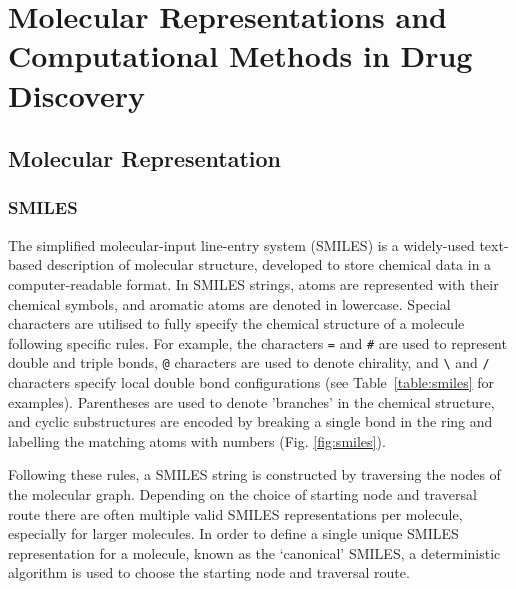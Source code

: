 \chapter{Molecular Representations and Computational Methods in Drug Discovery} \label{ch:background}

\section{Molecular Representation}

\subsection{SMILES}
The simplified molecular-input line-entry system (SMILES) \cite{Weininger1988, Weininger1989} is a widely-used text-based description of molecular structure, developed to store chemical data in a computer-readable format. In SMILES strings, atoms are represented with their chemical symbols, and aromatic atoms are denoted in lowercase. Special characters are utilised to fully specify the chemical structure of a molecule following specific rules. For example, the characters \texttt{=} and \texttt{\#} are used to represent double and triple bonds, \texttt{@} characters are used to denote chirality, and \texttt{\textbackslash} and \texttt{/} characters specify local double bond configurations (see Table~\ref{table:smiles} for examples). Parentheses are used to denote 'branches' in the chemical structure, and cyclic substructures are encoded by breaking a single bond in the ring and labelling the matching atoms with numbers (Fig. \ref{fig:smiles}).

Following these rules, a SMILES string is constructed by traversing the nodes of the molecular graph. Depending on the choice of starting node and traversal route there are often multiple valid SMILES representations per molecule, especially for larger molecules. In order to define a single unique SMILES representation for a molecule, known as the `canonical' SMILES, a deterministic algorithm is used to choose the starting node and traversal route. 


